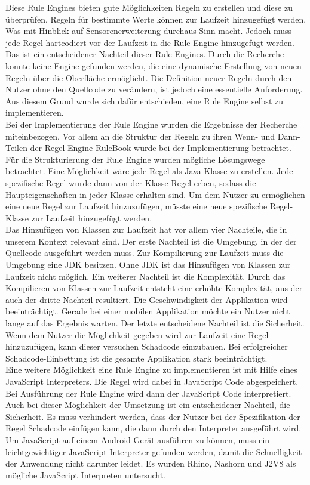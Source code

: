 Diese Rule Engines bieten gute Möglichkeiten Regeln zu erstellen und diese zu überprüfen. Regeln für bestimmte Werte können zur Laufzeit hinzugefügt werden. Was mit Hinblick auf Sensorenerweiterung durchaus Sinn macht. Jedoch muss jede Regel hartcodiert vor der Laufzeit in die Rule Engine hinzugefügt werden. Das ist ein entscheidener Nachteil dieser Rule Engines. Durch die Recherche konnte keine Engine gefunden werden, die eine dynamische Erstellung von neuen Regeln über die Oberfläche ermöglicht. Die Definition neuer Regeln durch den Nutzer ohne den Quellcode zu verändern, ist jedoch eine essentielle Anforderung. Aus diesem Grund wurde sich dafür entschieden, eine Rule Engine selbst zu implementieren.\\
Bei der Implementierung der Rule Engine wurden die Ergebnisse der Recherche miteinbezogen. Vor allem an die Struktur der Regeln zu ihren Wenn- und Dann-Teilen der Regel Engine RuleBook wurde bei der Implementierung betrachtet.\\
Für die Strukturierung der Rule Engine wurden mögliche Lösungswege betrachtet. Eine Möglichkeit wäre jede Regel als Java-Klasse zu erstellen. Jede spezifische Regel wurde dann von der Klasse Regel erben, sodass die Haupteigenschaften in jeder Klasse erhalten sind. Um dem Nutzer zu ermöglichen eine neue Regel zur Laufzeit hinzuzufügen, müsste eine neue spezifische Regel-Klasse zur Laufzeit hinzugefügt werden.\\
Das Hinzufügen von Klassen zur Laufzeit hat vor allem vier Nachteile, die in unserem Kontext relevant sind. Der erste Nachteil ist die Umgebung, in der der Quellcode ausgeführt werden muss. Zur Kompilierung zur Laufzeit muss die Umgebung eine JDK besitzen. Ohne JDK ist das Hinzufügen von Klassen zur Laufzeit nicht möglich. Ein weiterer Nachteil ist die Komplexität. Durch das Kompilieren von Klassen zur Laufzeit entsteht eine erhöhte Komplexität, aus der auch der dritte Nachteil resultiert. Die Geschwindigkeit der Applikation wird beeinträchtigt. Gerade bei einer mobilen Applikation möchte ein Nutzer nicht lange auf das Ergebnis warten. Der letzte entscheidene Nachteil ist die Sicherheit. Wenn dem Nutzer die Möglichkeit gegeben wird zur Laufzeit eine Regel hinzuzufügen, kann dieser versuchen Schadcode einzubauen. Bei erfolgreicher Schadcode-Einbettung ist die gesamte Applikation stark beeinträchtigt.\\
Eine weitere Möglichkeit eine Rule Engine zu implementieren ist mit Hilfe eines JavaScript Interpreters. Die Regel wird dabei in JavaScript Code abgespeichert. Bei Ausführung der Rule Engine wird dann der JavaScript Code interpretiert. Auch bei dieser Möglichkeit der Umsetzung ist ein entscheidener Nachteil, die Sicherheit. Es muss verhindert werden, dass der Nutzer bei der Spezifikation der Regel Schadcode einfügen kann, die dann durch den Interpreter ausgeführt wird. Um JavaScript auf einem Android Gerät ausführen zu können, muss ein leichtgewichtiger JavaScript Interpreter gefunden werden, damit die Schnelligkeit der Anwendung nicht darunter leidet. Es wurden Rhino, Nashorn und J2V8 als mögliche  JavaScript Interpreten untersucht.\\
